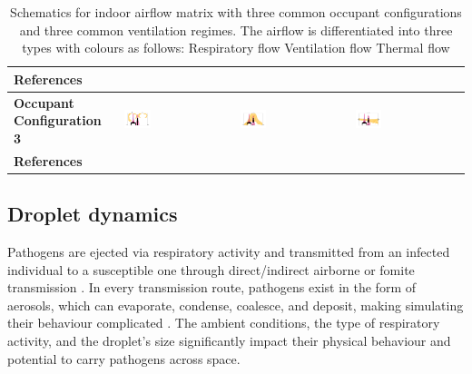 \documentclass[a4paper,12pt]{elsarticle}
\DeclareRobustCommand{\legendsquare}[1]{%
  \tikz[baseline=(a.south)]{\node[#1, inner sep=.8ex, outer sep=0] (a) {};}%
  }
\begin{document}
\begin{table}[ht]
\begin{tabular}{|m{2.5cm}|m{4cm}|m{4cm}|m{4cm}|}
    \hline
    \textbf{References} & \cite{he2011cfd,yan2021transmission,mirzaie2021covid,li2021effects,shao2021risk,qin2023transmission,xu2023cfd} & \cite{he2011cfd,lu2022ventilation,jain2023numerical} & \cite{ho2021modeling,duill2021impact,ren2022practical,lu2022ventilation} \\
    \hline
    \textbf{Occupant Configuration 3} &\includegraphics[clip,trim={0 2cm 0 2cm},width=0.25\textwidth]{Airflow/mat3.jpeg}& \includegraphics[clip,trim={0 2cm 0 2cm},width=0.25\textwidth]{Airflow/mat6.jpeg}& \includegraphics[clip,trim={0 2cm 0 2cm},width=0.25\textwidth]{Airflow/mat9.jpeg} \\
    \hline
    \textbf{References} & \cite{hang2014influence,romano2015numerical,liu2020full,lu2020reducing,zhou2021experimental,guo2022visualization,liu2023estimating} & \cite{zhou2021experimental,villafruela2019assessment,lu2020reducing} & \cite{jiang2009investigating,lu2020reducing} \\
    \hline
    \end{tabular}
    \caption{Schematics for indoor airflow matrix with three common occupant configurations and three common ventilation regimes. The airflow is differentiated into three types with colours as follows: \legendsquare{fill=resp} Respiratory flow \legendsquare{fill=vent} Ventilation flow \legendsquare{fill=therm} Thermal flow }
    \label{tab:mat}
\end{table}

\subsection{Droplet dynamics}

Pathogens are ejected via respiratory activity and transmitted from an infected individual to a susceptible one through direct/indirect airborne or fomite transmission \cite{leung2021transmissibility}. In every transmission route, pathogens exist in the form of aerosols, which can evaporate, condense, coalesce, and deposit, making simulating their behaviour complicated \cite{rosti2020fluid,zhou2021dynamical}. The ambient conditions, the type of respiratory activity, and the droplet's size significantly impact their physical behaviour and potential to carry pathogens across space.
\end{document}
